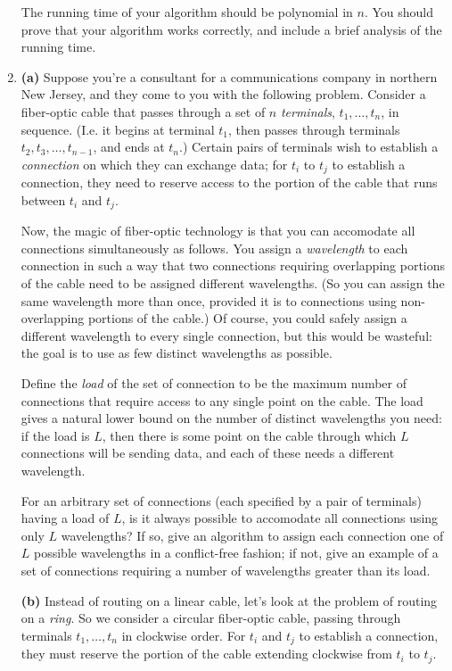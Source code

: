 \documentclass[12pt]{article}
\def\gap{0.2in}
\begin{document}
\begin{enumerate}
The running time of your algorithm should be polynomial in $n$.
You should prove that your algorithm works correctly, and include a
brief analysis of the running time.




\item

{\bf (a)}
Suppose you're a consultant for a communications
company in northern New Jersey, and they come to
you with the following problem.
Consider a fiber-optic cable that passes through
a set of $n$ {\em terminals}, $t_1, \ldots, t_n$, in sequence.
(I.e. it begins at terminal $t_1$, then passes through
terminals $t_2, t_3, \ldots, t_{n-1}$, and ends at $t_n$.)
Certain pairs of terminals wish to establish a
{\em connection} on which they can exchange data;
for $t_i$ to $t_j$ to establish a connection,
they need to reserve access to the portion of
the cable that runs between $t_i$ and $t_j$.

Now, the magic of fiber-optic technology is that you can
accomodate all connections simultaneously as follows.
You assign a {\em wavelength} to each connection
in such a way that two connections requiring overlapping
portions of the cable need to be assigned different wavelengths.
(So you can assign the same wavelength more than once, provided it
is to connections using non-overlapping portions of the cable.)
Of course, you could safely assign a different wavelength
to every single connection, but this would be wasteful:
the goal is to use as few distinct wavelengths as possible.

Define the {\em load} of the set of connection to be
the maximum number of connections that require access
to any single point on the cable.
The load gives a natural lower bound on the number of
distinct wavelengths you need: if the load is $L$,
then there is some point on the cable through which
$L$ connections will be sending data, and each of
these needs a different wavelength.

For an arbitrary set of connections (each specified by
a pair of terminals) having a load of $L$,
is it always possible to accomodate all connections
using only $L$ wavelengths?
If so, give an algorithm to assign each connection
one of $L$ possible wavelengths in a conflict-free fashion;
if not, give an example of a set of connections
requiring a number of wavelengths greater than its load.

\vskip \gap
{\bf (b)} Instead of routing on a linear cable,
let's look at the problem of routing on a {\em ring}.
So we consider a circular fiber-optic cable, passing through
terminals $t_1, \ldots, t_n$ in clockwise order.
For $t_i$ and $t_j$ to establish a connection, they must
reserve the portion of the cable extending clockwise
from $t_i$ to $t_j$.


\end{enumerate}
\end{document}
